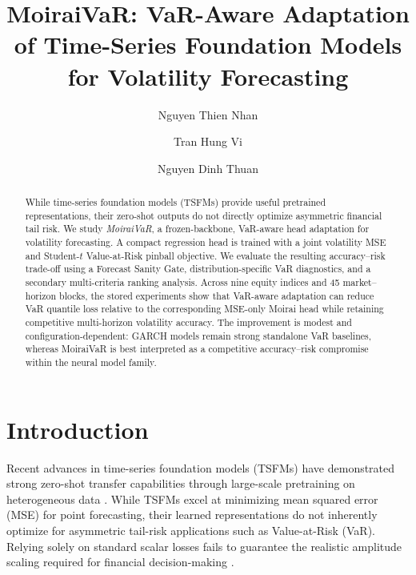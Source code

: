 \documentclass[runningheads]{llncs}
\begin{document}
\title{MoiraiVaR: VaR-Aware Adaptation of Time-Series Foundation Models for Volatility Forecasting}
\titlerunning{\relax}

\author{Nguyen Thien Nhan \and
Tran Hung Vi \and
Nguyen Dinh Thuan}
\authorrunning{\relax}

\maketitle

\begin{abstract}
While time-series foundation models (TSFMs) provide useful pretrained representations, their zero-shot outputs do not directly optimize asymmetric financial tail risk. We study \textit{MoiraiVaR}, a frozen-backbone, VaR-aware head adaptation for volatility forecasting. A compact regression head is trained with a joint volatility MSE and Student-$t$ Value-at-Risk pinball objective. We evaluate the resulting accuracy--risk trade-off using a Forecast Sanity Gate, distribution-specific VaR diagnostics, and a secondary multi-criteria ranking analysis. Across nine equity indices and 45 market--horizon blocks, the stored experiments show that VaR-aware adaptation can reduce VaR quantile loss relative to the corresponding MSE-only Moirai head while retaining competitive multi-horizon volatility accuracy. The improvement is modest and configuration-dependent: GARCH models remain strong standalone VaR baselines, whereas MoiraiVaR is best interpreted as a competitive accuracy--risk compromise within the neural model family.

\end{abstract}

\section{Introduction}
Recent advances in time-series foundation models (TSFMs) have demonstrated strong zero-shot transfer capabilities through large-scale pretraining on heterogeneous data \cite{ref7,ref8}. While TSFMs excel at minimizing mean squared error (MSE) for point forecasting, their learned representations do not inherently optimize for asymmetric tail-risk applications such as Value-at-Risk (VaR). Relying solely on standard scalar losses fails to guarantee the realistic amplitude scaling required for financial decision-making \cite{ref1}.
\end{document}
